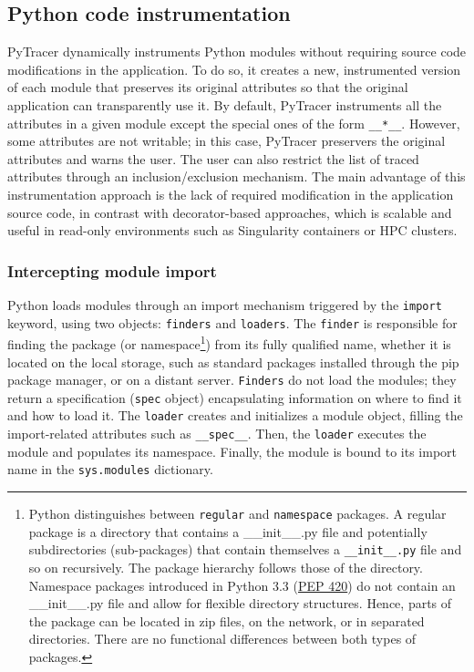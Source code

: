 \documentclass[11pt]{article}
\newcommand{\tristan}[1]{\color{orange}\textbf{From Tristan:} #1\color{black}\xspace}
\newcommand{\pytracer}[0]{PyTracer\xspace}
\begin{document}
\subsection{Python code instrumentation}



\pytracer dynamically instruments Python modules
without requiring source code modifications in the application.
To do so, it creates a new, instrumented version of each module that preserves its original attributes so that the original application can transparently use it.
By default, \pytracer instruments all the attributes
in a given module except the special ones of the form \texttt{\_\_*\_\_}.
However, some attributes are not writable; in this case, \pytracer preservers the original attributes and warns the user. The user can also restrict the list of traced attributes through
an inclusion/exclusion mechanism. The main advantage of this instrumentation approach is the lack of required modification in the application source code, in contrast with decorator-based approaches, which is scalable and useful in read-only environments such as Singularity containers or HPC clusters.


\subsubsection{Intercepting module import}

Python loads modules through an import mechanism triggered by the \texttt{import} keyword, using two objects: \texttt{finders} and \texttt{loaders}.
The \texttt{finder} is responsible for finding the package (or 
namespace\footnote{Python distinguishes between \texttt{regular} and \texttt{namespace} packages.
A regular package is a directory that contains a \_\_init\_\_.py file and potentially subdirectories (sub-packages) 
that contain themselves a \texttt{\_\_init\_\_.py} file and so on recursively. 
The package hierarchy follows those of the directory. 
Namespace packages introduced in Python 3.3 (\href{https://www.python.org/dev/peps/pep-0420/}{PEP 420}) do not contain an
\_\_init\_\_.py file and allow for flexible directory structures. Hence, parts of the package can be located in zip files, on the network, or in separated directories. There are no functional differences between both types of packages.}) from its fully qualified name, whether it is located on the local storage, such as standard packages installed through the pip package manager, or on a distant server.
\texttt{Finders} do not load the modules; they return a specification (\texttt{spec} object) encapsulating 
information on where to find it and how to load it.
The \texttt{loader} creates and initializes a module object, filling the import-related attributes 
such as \texttt{\_\_spec\_\_}. 
Then, the \texttt{loader} executes the module and populates its namespace. Finally, the module is bound to its import name in the \texttt{sys.modules} dictionary.
\end{document}
